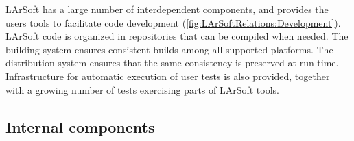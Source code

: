 LArSoft has a large number of interdependent components,
and provides the users tools to facilitate code development (\cref{fig:LArSoftRelations:Development}).
LArSoft code is organized in repositories that can be compiled when needed.
The building system ensures consistent builds among all supported platforms.
The \UPS~\cite{UPS} distribution system ensures that the same consistency is preserved at run time.
Infrastructure for automatic execution of user tests is also provided,
together with a growing number of tests exercising parts of LArSoft tools.



\subsection{Internal components}
\label{ssec:Components:Internal}

